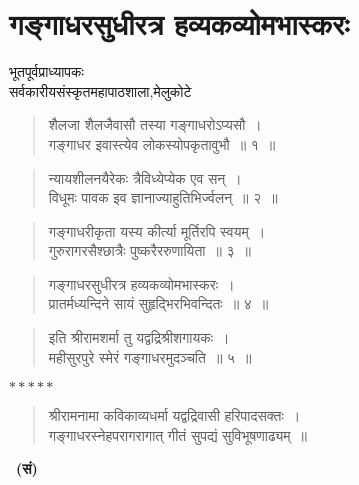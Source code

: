 {\fontsize{16}{18}\selectfont
\presetvalues
\chapter{गङ्गाधरसुधीरत्र हव्यकव्योमभास्करः}

\begin{center}
\smallskip

भूतपूर्वप्राध्यापकः\\
सर्वकारीयसंस्कृतमहापाठशाला,मेलुकोटे \\

\addrule
\end{center}

\begin{verse}
शैलजा शैलजैवासौ तस्या गङ्गाधरोऽप्यसौ~।\\
गङ्गाधर इवास्त्येव लोकस्योपकृतावुभौ~॥ १~॥
\end{verse}

\begin{verse}
न्यायशीलनयैरेकः त्रैविध्येप्येक एव सन्~।\\
विधूमः पावक इव ज्ञानाज्याहुतिभिर्ज्वलन्~॥ २~॥
\end{verse}

\begin{verse}
गङ्गाधरीकृता यस्य कीर्त्या मूर्तिरपि स्वयम्~।\\
गुरुरागरसैश्छात्रैः पुष्करैररुणायिता~॥ ३~॥
\end{verse}

\begin{verse}
गङ्गाधरसुधीरत्र हव्यकव्योमभास्करः~।\\
प्रातर्मध्यन्दिने सायं सुहृद्भिरभिवन्दितः~॥ ४~॥
\end{verse}

\begin{verse} 
इति श्रीरामशर्मा तु यद्वद्रिश्रीशगायकः~।\\
महीसुरपुरे स्मेरं गङ्गाधरमुदञ्चति~॥ ५~॥
\end{verse}

\centerline{$*****$}

\begin{verse}
श्रीरामनामा कविकाव्यधर्मा यद्वद्रिवासी हरिपादसक्तः~।\\
गङ्गाधरस्नेहपरागरागात्  गीतं सुपद्यं सुविभूषणाढ्यम्~॥
\end{verse}

~\hfill\textbf{(सं)}\hspace{3cm}

\articleend
}

